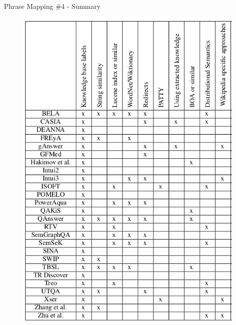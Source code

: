 \documentclass{beamer}
\begin{document}
\begin{frame}{Phrase Mapping \#4 - Summary}
  \begin{cardTiny}
    \begin{figure}\label{fig:pm_table}
      \centering
      \includegraphics[height=0.8\textheight]{./res/pm_table.png}
    \end{figure}
  \end{cardTiny}
\end{frame}

\end{document}
